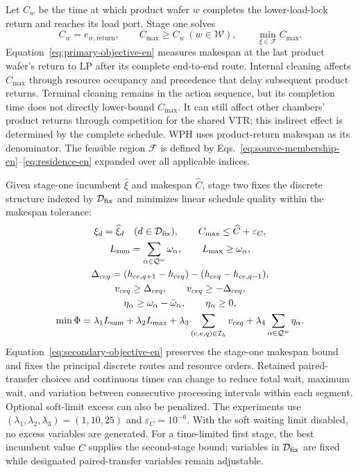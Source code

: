 \documentclass[journal]{IEEEtran}
\begin{document}
Let $C_w$ be the time at which product wafer $w$ completes the lower-load-lock return and reaches its load port. Stage one solves
\begin{equation}
C_w=e_{w,\mathrm{return}},\qquad
C_{\max}\ge C_w\ (w\in\mathcal W),\qquad
\min_{\xi\in\mathcal F}C_{\max}.
\label{eq:primary-objective-en}
\end{equation}
Equation~\eqref{eq:primary-objective-en} measures makespan at the last product wafer's return to LP after its complete end-to-end route. Internal cleaning affects $C_{\max}$ through resource occupancy and precedence that delay subsequent product returns. Terminal cleaning remains in the action sequence, but its completion time does not directly lower-bound $C_{\max}$. It can still affect other chambers' product returns through competition for the shared VTR; this indirect effect is determined by the complete schedule. WPH uses product-return makespan as its denominator. The feasible region $\mathcal F$ is defined by Eqs.~\eqref{eq:source-membership-en}--\eqref{eq:residence-en} expanded over all applicable indices.

Given stage-one incumbent $\widehat\xi$ and makespan $\widehat C$, stage two fixes the discrete structure indexed by $\mathcal D_{\rm fix}$ and minimizes linear schedule quality within the makespan tolerance:
\begin{equation}
\begin{gathered}
\xi_d=\widehat\xi_d\quad(d\in\mathcal D_{\rm fix}),\qquad
C_{\max}\le\widehat C+\varepsilon_C,\\
L_{\rm sum}=\sum_{\alpha\in\mathcal Q^w}\omega_\alpha,\qquad
L_{\max}\ge\omega_\alpha,\\
\Delta_{ceq}=(h_{ce,q+1}-h_{ceq})-(h_{ceq}-h_{ce,q-1}),\\
v_{ceq}\ge\Delta_{ceq},\qquad v_{ceq}\ge-\Delta_{ceq},\\
\eta_\alpha\ge\omega_\alpha-\bar\omega_\alpha,\qquad
\eta_\alpha\ge0,\\
\min\Phi=\lambda_1L_{\rm sum}+\lambda_2L_{\max}
+\lambda_3\sum_{(c,e,q)\in\mathcal I_h}v_{ceq}
+\lambda_4\sum_{\alpha\in\mathcal Q^w}\eta_\alpha.
\end{gathered}
\label{eq:secondary-objective-en}
\end{equation}
Equation~\eqref{eq:secondary-objective-en} preserves the stage-one makespan bound and fixes the principal discrete routes and resource orders. Retained paired-transfer choices and continuous times can change to reduce total wait, maximum wait, and variation between consecutive processing intervals within each segment. Optional soft-limit excess can also be penalized. The experiments use $(\lambda_1,\lambda_2,\lambda_3)=(1,10,25)$ and $\varepsilon_C=10^{-6}$. With the soft waiting limit disabled, no excess variables are generated. For a time-limited first stage, the best incumbent value $\widehat C$ supplies the second-stage bound; variables in $\mathcal D_{\rm fix}$ are fixed while designated paired-transfer variables remain adjustable.
\end{document}
